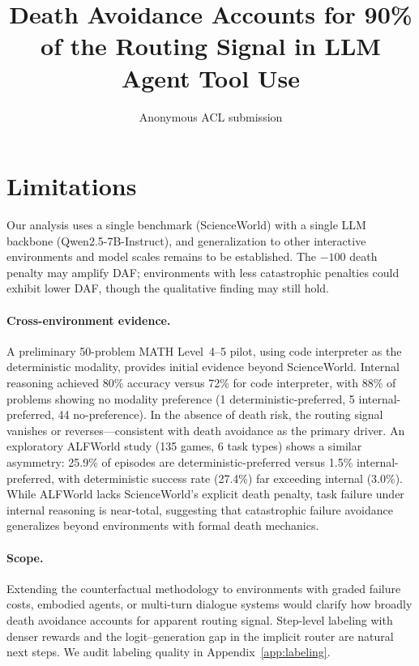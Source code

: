 \documentclass[11pt]{article}
\title{Death Avoidance Accounts for 90\% of the Routing Signal in LLM Agent Tool Use}
\author{Anonymous ACL submission}
\begin{document}
\maketitle







\section*{Limitations}

Our analysis uses a single benchmark (ScienceWorld) with a single LLM backbone (Qwen2.5-7B-Instruct), and generalization to other interactive environments and model scales remains to be established. The $-100$ death penalty may amplify DAF; environments with less catastrophic penalties could exhibit lower DAF, though the qualitative finding may still hold.

\paragraph{Cross-environment evidence.}
A preliminary 50-problem MATH Level~4--5 pilot, using code interpreter as the deterministic modality, provides initial evidence beyond ScienceWorld. Internal reasoning achieved 80\% accuracy versus 72\% for code interpreter, with 88\% of problems showing no modality preference (1 deterministic-preferred, 5 internal-preferred, 44 no-preference). In the absence of death risk, the routing signal vanishes or reverses---consistent with death avoidance as the primary driver. An exploratory ALFWorld study (135 games, 6 task types) shows a similar asymmetry: 25.9\% of episodes are deterministic-preferred versus 1.5\% internal-preferred, with deterministic success rate (27.4\%) far exceeding internal (3.0\%). While ALFWorld lacks ScienceWorld's explicit death penalty, task failure under internal reasoning is near-total, suggesting that catastrophic failure avoidance generalizes beyond environments with formal death mechanics.

\paragraph{Scope.}
Extending the counterfactual methodology to environments with graded failure costs, embodied agents, or multi-turn dialogue systems would clarify how broadly death avoidance accounts for apparent routing signal. Step-level labeling with denser rewards and the logit--generation gap in the implicit router are natural next steps. We audit labeling quality in Appendix~\ref{app:labeling}.
\end{document}
